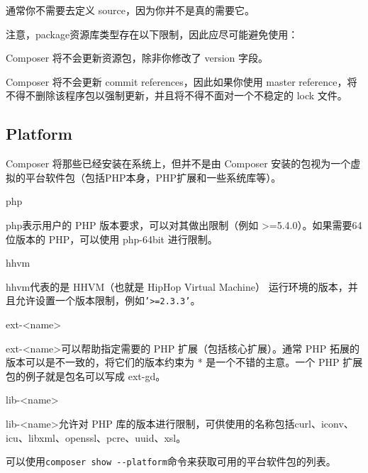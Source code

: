 通常你不需要去定义 source，因为你并不是真的需要它。

注意，package资源库类型存在以下限制，因此应尽可能避免使用：

\begin{compactitem}
\item Composer 将不会更新资源包，除非你修改了 version 字段。
\item Composer 将不会更新 commit references，因此如果你使用 master reference，将不得不删除该程序包以强制更新，并且将不得不面对一个不稳定的 lock 文件。
\end{compactitem}




\subsection{Platform}

Composer 将那些已经安装在系统上，但并不是由 Composer 安装的包视为一个虚拟的平台软件包（包括PHP本身，PHP扩展和一些系统库等）。

\begin{compactitem}
\item php

php表示用户的 PHP 版本要求，可以对其做出限制（例如 >=5.4.0）。如果需要64位版本的 PHP，可以使用 php-64bit 进行限制。

\item hhvm

hhvm代表的是 HHVM（也就是 HipHop Virtual Machine） 运行环境的版本，并且允许设置一个版本限制，例如\texttt{'>=2.3.3'}。

\item ext-<name>

ext-<name>可以帮助指定需要的 PHP 扩展（包括核心扩展）。通常 PHP 拓展的版本可以是不一致的，将它们的版本约束为 * 是一个不错的主意。一个 PHP 扩展包的例子就是包名可以写成 ext-gd。

\item lib-<name>

lib-<name>允许对 PHP 库的版本进行限制，可供使用的名称包括curl、iconv、icu、libxml、openssl、pcre、uuid、xsl。
\end{compactitem}

可以使用\texttt{composer show -\/-platform}命令来获取可用的平台软件包的列表。


